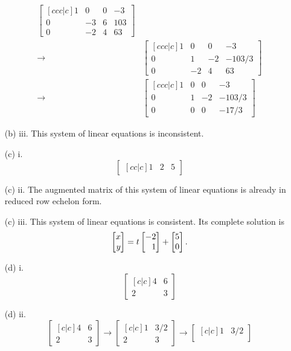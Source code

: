 \begin{exercises}
\begin{problist}
\begin{solution}
\begin{enumerate}
\begin{align*}
\begin{bmatrix}[ccc|c]
						1 & 0 & 0 & -3\\
						0 & -3 & 6 & 103\\
						0 & -2 & 4 & 63
					\end{bmatrix}\\
					\rightarrow
					&\begin{bmatrix}[ccc|c]
						1 & 0 & 0 & -3\\
						0 & 1 & -2 & -103/3\\
						0 & -2 & 4 & 63
					\end{bmatrix}\\
					\rightarrow
					&\begin{bmatrix}[ccc|c]
						1 & 0 & 0 & -3\\
						0 & 1 & -2 & -103/3\\
						0 & 0 & 0 & -17/3
					\end{bmatrix}
				\end{align*}
				\item[(b) iii.]
				This system of linear equations is inconsistent.
				\item[(c) i.]
				\[
					\begin{bmatrix}[cc|c]
						1 & 2 & 5
					\end{bmatrix}
				\]
				\item[(c) ii.]
				The augmented matrix of this system of linear equations is already in reduced row echelon form.
				\item[(c) iii.]
				This system of linear equations is consistent. Its complete solution is
				\[
					\mat{x\\y}=t\mat{-2\\1}+\mat{5\\0}.
				\]
				\item[(d) i.]
				\[
					\begin{bmatrix}[c|c]
						4 & 6\\
						2 & 3
					\end{bmatrix}
				\]
				\item[(d) ii.]
				\[
					\begin{bmatrix}[c|c]
					4 & 6\\
					2 & 3
					\end{bmatrix}
					\rightarrow
					\begin{bmatrix}[c|c]
					1 & 3/2\\
					2 & 3
					\end{bmatrix}
					\rightarrow
					\begin{bmatrix}[c|c]
					1 & 3/2\\

\end{bmatrix}\]
\end{enumerate}
\end{solution}
\end{problist}
\end{exercises}
